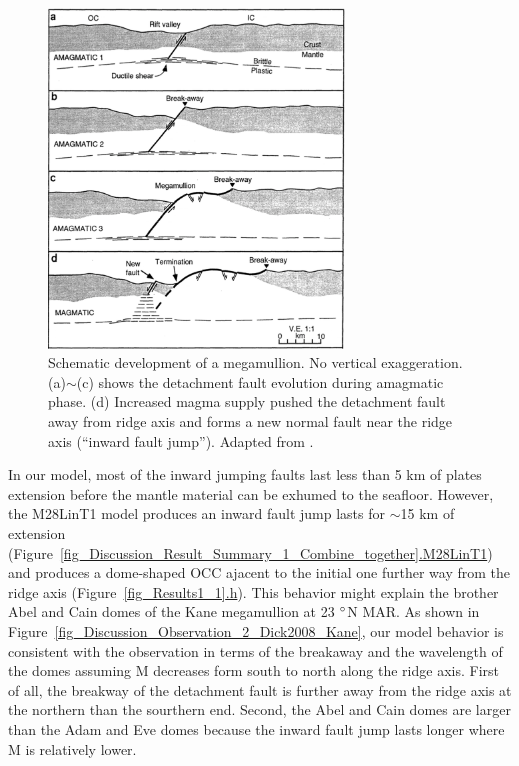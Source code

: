 \begin{figure}[h]
 \centering
  \includegraphics[width=0.7\textwidth]{./Figures/fig_Discussion_Observation_1_Tucholke1998.eps}
 \caption[Schematic development of a megamullion from amagmatic to magmatic, adapted from \citep{Tucholke1998}.]{Schematic development of a megamullion. No vertical exaggeration. (a)$\sim$(c) shows the detachment fault evolution during amagmatic phase. (d) Increased magma supply pushed the detachment fault away from ridge axis and forms a new normal fault near the ridge axis (``inward fault jump''). Adapted from \citep{Tucholke1998}.}
 \label{fig_Discussion_Observation_1_Tucholke1998}
\end{figure}

In our model, most of the inward jumping faults last less than 5 km of plates extension before the mantle material can be exhumed to the seafloor. However, the M28LinT1 model produces an inward fault jump lasts for $\sim$15 km of extension (Figure~\hyperref[fig_Discussion_Result_Summary_1_Combine_together]{\ref{fig_Discussion_Result_Summary_1_Combine_together}.M28LinT1}) and produces a dome-shaped OCC ajacent to the initial one further way from the ridge axis (Figure~\hyperref[fig_Results1_1]{\ref{fig_Results1_1}.h}). This behavior might explain the brother Abel and Cain domes of the Kane megamullion at 23 $\degree$N MAR. As shown in Figure~\hyperref[fig_Discussion_Observation_2_Dick2008_Kane]{\ref{fig_Discussion_Observation_2_Dick2008_Kane}}, our model behavior is consistent with the observation in terms of the breakaway and the wavelength of the domes assuming M decreases form south to north along the ridge axis. First of all, the breakway of the detachment fault is further away from the ridge axis at the northern than the sourthern end. Second, the Abel and Cain domes are larger than the Adam and Eve domes because the inward fault jump lasts longer where M is relatively lower.    

